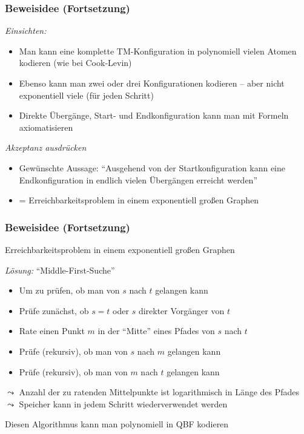 \documentclass[aspectratio=1610,onlymath]{beamer}
\begin{document}
\begin{frame}\frametitle{Beweisidee (Fortsetzung)}

\emph{Einsichten:}
\begin{itemize}
\item Man kann eine komplette TM-Konfiguration in polynomiell vielen Atomen
  kodieren (wie bei Cook-Levin)
\item Ebenso kann man zwei oder drei Konfigurationen kodieren -- aber nicht exponentiell viele (für jeden Schritt)
\item Direkte Übergänge, Start- und Endkonfiguration kann man mit Formeln axiomatisieren
\end{itemize}\bigskip\pause

\emph{Akzeptanz ausdrücken}
\begin{itemize}
\item Gewünschte Aussage: "`Ausgehend von der Startkonfiguration kann eine Endkonfiguration in endlich vielen Übergängen erreicht werden"'
\item = Erreichbarkeitsproblem in einem exponentiell großen Graphen
\end{itemize}


\end{frame}

\begin{frame}\frametitle{Beweisidee (Fortsetzung)}

\alert{Erreichbarkeitsproblem in einem exponentiell großen Graphen}
\bigskip\pause

\emph{Lösung:} "`Middle-First-Suche"'
\begin{itemize}
\item Um zu prüfen, ob man von $s$ nach $t$ gelangen kann
\item Prüfe zunächst, ob $s=t$ oder $s$ direkter Vorgänger von $t$
\item Rate einen Punkt $m$ in der "`Mitte"' eines Pfades von $s$ nach $t$
\item Prüfe (rekursiv), ob man von $s$ nach $m$ gelangen kann
\item Prüfe (rekursiv), ob man von $m$ nach $t$ gelangen kann
\end{itemize}\pause
$\leadsto$ Anzahl der zu ratenden Mittelpunkte ist logarithmisch in Länge des Pfades\\
$\leadsto$ Speicher kann in jedem Schritt wiederverwendet werden
\bigskip

Diesen Algorithmus kann man polynomiell in QBF kodieren

\end{frame}
\end{document}
